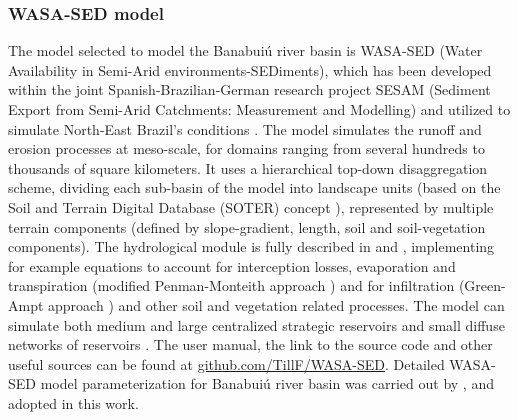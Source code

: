 \documentclass[draft]{agujournal2019}
\begin{document}
\subsubsection{WASA-SED model}
The model selected to model the Banabuiú river basin is WASA-SED (Water Availability in Semi-Arid environments-SEDiments), which has been developed within the joint Spanish-Brazilian-German research project SESAM (Sediment Export from Semi-Arid Catchments: Measurement and Modelling) and utilized to simulate North-East Brazil’s conditions \cite{Guntner2002,Guntner2004,Mueller2010}. The model simulates the runoff and erosion processes at meso-scale, for domains ranging from several hundreds to thousands of square kilometers. It uses a hierarchical top-down disaggregation scheme, dividing each sub-basin of the model into landscape units (based on the Soil and Terrain Digital Database (SOTER) concept \cite{Oldeman1993}), represented by multiple terrain components (defined by slope-gradient, length, soil and soil-vegetation components). The hydrological module is fully described in  and , implementing for example equations to account for interception losses, evaporation and transpiration (modified Penman-Monteith approach \cite{Shuttleworth1985}) and for infiltration (Green-Ampt approach \cite{Green1911}) and other soil and vegetation related processes. The model can simulate both medium and large  centralized strategic reservoirs and small diffuse networks of reservoirs \cite{Guntner2004}. The user manual, the link to the source code and other useful sources can be found at \url{github.com/TillF/WASA-SED}. Detailed WASA-SED model parameterization for Banabuiú river basin was carried out by , and adopted in this work.
\end{document}
